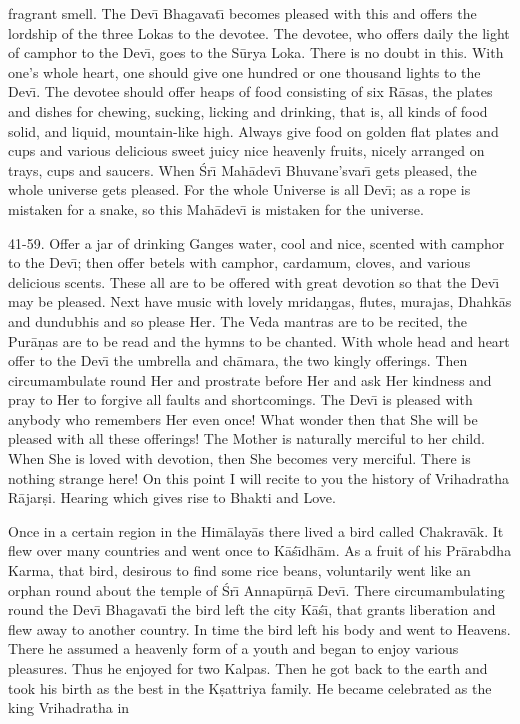 fragrant smell. The Dev\={\i} Bhagavat\={\i} becomes pleased with this and offers the lordship of the three Lokas to the devotee. The devotee, who offers daily the light of camphor to the Dev\={\i}, goes to the S\=urya Loka. There is no doubt in this. With one's whole heart, one should give one hundred or one thousand lights to the Dev\={\i}. The devotee should offer heaps of food consisting of six R\=asas, the plates and dishes for chewing, sucking, licking and drinking, that is, all kinds of food solid, and liquid, mountain-like high. Always give food on golden flat plates and cups and various delicious sweet juicy nice heavenly fruits, nicely arranged on trays, cups and saucers. When \'Sr\={\i} Mah\=adev\={\i} Bhuvane'svar\={\i} gets pleased, the whole universe gets pleased. For the whole Universe is all Dev\={\i}; as a rope is mistaken for a snake, so this Mah\=adev\={\i} is mistaken for the universe.

41-59. Offer a jar of drinking Ganges water, cool and nice, scented with camphor to the Dev\={\i}; then offer betels with camphor, cardamum, cloves, and various delicious scents. These all are to be offered with great devotion so that the Dev\={\i} may be pleased. Next have music with lovely mrida\d{n}gas, flutes, murajas, Dhahk\=as and dundubhis and so please Her. The Veda mantras are to be recited, the Pur\=a\d{n}as are to be read and the hymns to be chanted. With whole head and heart offer to the Dev\={\i} the umbrella and ch\=amara, the two kingly offerings. Then circumambulate round Her and prostrate before Her and ask Her kindness and pray to Her to forgive all faults and shortcomings. The Dev\={\i} is pleased with anybody who remembers Her even once! What wonder then that She will be pleased with all these offerings! The Mother is naturally merciful to her child. When She is loved with devotion, then She becomes very merciful. There is nothing strange here! On this point I will recite to you the history of Vrihadratha R\=ajar\d{s}i. Hearing which gives rise to Bhakti and Love.

Once in a certain region in the Him\=alay\=as there lived a bird called Chakrav\=ak. It flew over many countries and went once to K\=a\'s\={\i}dh\=am. As a fruit of his Pr\=arabdha Karma, that bird, desirous to find some rice beans, voluntarily went like an orphan round about the temple of \'Sr\={\i} Annap\=ur\d{n}\=a Dev\={\i}. There circumambulating round the Dev\={\i} Bhagavat\={\i} the bird left the city K\=a\'s\={\i}, that grants liberation and flew away to another country. In time the bird left his body and went to Heavens. There he assumed a heavenly form of a youth and began to enjoy various pleasures. Thus he enjoyed for two Kalpas. Then he got back to the earth and took his birth as the best in the K\d{s}attriya family. He became celebrated as the king Vrihadratha in

